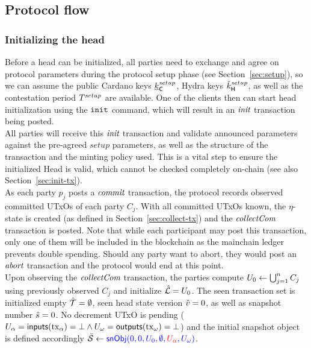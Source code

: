 \subsection{Protocol flow}

\subsubsection{Initializing the head}

\quad Before a head can be initialized, all parties need
to exchange and agree on protocol parameters during the protocol setup phase
(see Section~\ref{sec:setup}), so we can assume the public Cardano keys
$\underline{k}_\mathsf{C}^{setup}$, Hydra keys $\tilde{k}_{\mathsf{H}}^{setup}$, as well as the
contestation period $T^{setup}$ are available. One of the clients then can
start head initialization using the $\mathtt{init}$ command, which will result in an
$\textit{init}$ transaction being posted. \\

\quad All parties will receive this $\textit{init}$
transaction and validate announced parameters against the pre-agreed $setup$
parameters, as well as the structure of the transaction and the minting policy
used. This is a vital step to ensure the initialized Head is valid, which
cannot be checked completely on-chain (see also Section~\ref{sec:init-tx}). \\

\quad As each party $p_{j}$ posts a
$\textit{commit}$ transaction, the protocol records observed committed UTxOs of each
party $C_j$. With all committed UTxOs known, the $\eta$-state is created (as
defined in Section~\ref{sec:collect-tx}) and the $\textit{collectCom}$ transaction is
posted. Note that while each participant may post this transaction, only one of
them will be included in the blockchain as the mainchain ledger prevents double
spending. Should any party want to abort, they would post an $\textit{abort}$
transaction and the protocol would end at this point.\\

\quad Upon observing the $\textit{collectCom}$
transaction, the parties compute $U_{0} \gets \bigcup_{j=1}^{n} C_j$ using previously
observed $C_j$ and initialize $\hat {\mathcal L} = U_{0}$. The seen transaction set is
initialized empty $\hat {\mathcal T} = \emptyset$, seen head state version $\hat v = 0$, as
well as snapshot number $\hat s = 0$. No decrement UTxO is pending
($U_\alpha = \mathsf{inputs}(\mathrm{tx}_\alpha) = \bot \land U_\omega = \mathsf{outputs}(\mathrm{tx}_\omega) = \bot$) and the initial snapshot object is defined accordingly
$\bar{\mathcal S} \gets \textcolor{blue}{\mathsf{snObj}(0, 0, U_{0}, \emptyset, \textcolor{red}{U_\alpha}, U_\omega)}$.

